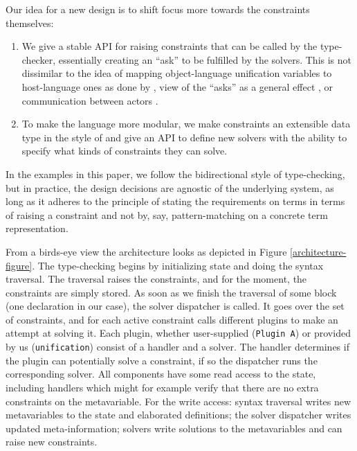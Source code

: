 \documentclass[
  sigconf,
  screen,
  review]{acmart}
\begin{document}
Our idea for a new design is to shift focus more towards the constraints
themselves:

\begin{enumerate}
\def\labelenumi{\arabic{enumi}.}
\item
  We give a stable API for raising constraints that can be called by the
  type-checker, essentially creating an ``ask'' to be fulfilled by the
  solvers. This is not dissimilar to the idea of mapping object-language
  unification variables to host-language ones as done by
  \citet{guidiImplementingTypeTheory2017}, view of the ``asks'' as a
  general effect \citep[chap.~4.4]{bauerEqualityCheckingGeneral2020}, or
  communication between actors \citep{allaisTypOSOperatingSystem2022a}.
\item
  To make the language more modular, we make constraints an extensible
  data type in the style of \citet{swierstraDataTypesCarte2008} and give
  an API to define new solvers with the ability to specify what kinds of
  constraints they can solve.
\end{enumerate}

In the examples in this paper, we follow the bidirectional style of
type-checking, but in practice, the design decisions are agnostic of the
underlying system, as long as it adheres to the principle of stating the
requirements on terms in terms of raising a constraint and not by, say,
pattern-matching on a concrete term representation.

From a birds-eye view the architecture looks as depicted in Figure
\ref{architecture-figure}. The type-checking begins by initializing
state and doing the syntax traversal. The traversal raises the
constraints, and for the moment, the constraints are simply stored. As
soon as we finish the traversal of some block (one declaration in our
case), the solver dispatcher is called. It goes over the set of
constraints, and for each active constraint calls different plugins to
make an attempt at solving it. Each plugin, whether user-supplied
(\texttt{Plugin\ A}) or provided by us (\texttt{unification}) consist of
a handler and a solver. The handler determines if the plugin can
potentially solve a constraint, if so the dispatcher runs the
corresponding solver. All components have some read access to the state,
including handlers which might for example verify that there are no
extra constraints on the metavariable. For the write access: syntax
traversal writes new metavariables to the state and elaborated
definitions; the solver dispatcher writes updated meta-information;
solvers write solutions to the metavariables and can raise new
constraints.
\end{document}
